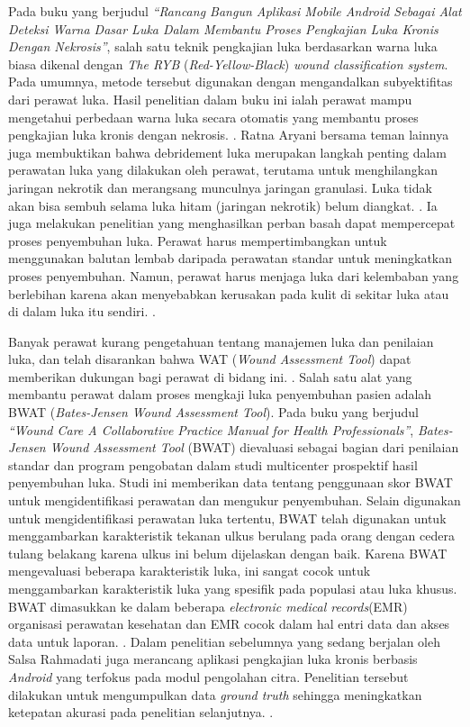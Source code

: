Pada buku yang berjudul \textit{“Rancang Bangun Aplikasi Mobile Android Sebagai Alat Deteksi Warna Dasar Luka Dalam Membantu Proses Pengkajian Luka Kronis Dengan Nekrosis”}, salah satu teknik pengkajian luka berdasarkan warna luka biasa dikenal dengan \textit{The RYB} (\textit{Red-Yellow-Black}) \textit{wound classification system}. Pada umumnya, metode tersebut digunakan dengan mengandalkan subyektifitas dari perawat luka. Hasil penelitian dalam buku ini ialah perawat mampu mengetahui perbedaan warna luka secara otomatis yang membantu proses pengkajian luka kronis dengan nekrosis. \citep{aryani2018}. Ratna Aryani bersama teman lainnya juga membuktikan bahwa debridement luka merupakan langkah penting dalam perawatan luka yang dilakukan oleh perawat, terutama untuk menghilangkan jaringan nekrotik dan merangsang munculnya jaringan granulasi. Luka tidak akan bisa sembuh selama luka hitam (jaringan nekrotik) belum diangkat. \citep{aryani2017autolytic}. Ia juga melakukan penelitian yang menghasilkan perban basah dapat mempercepat proses penyembuhan luka. Perawat harus mempertimbangkan untuk menggunakan balutan lembab daripada perawatan standar untuk meningkatkan proses penyembuhan. Namun, perawat harus menjaga luka dari kelembaban yang berlebihan karena akan menyebabkan kerusakan pada kulit di sekitar luka atau di dalam luka itu sendiri. \citep{aryani2016accelerating}.

Banyak perawat kurang pengetahuan tentang manajemen luka dan penilaian luka, dan telah disarankan bahwa WAT (\textit{Wound Assessment Tool}) dapat memberikan dukungan bagi perawat di bidang ini. \citep{Greatrex-White2015wound}. Salah satu alat yang membantu perawat dalam proses mengkaji luka penyembuhan pasien adalah BWAT (\textit{Bates-Jensen Wound Assessment Tool}). Pada buku yang berjudul \textit{“Wound Care A Collaborative Practice Manual for Health Professionals”}, \textit{Bates-Jensen Wound Assessment Tool} (BWAT) dievaluasi sebagai bagian dari penilaian standar dan program pengobatan dalam studi multicenter prospektif hasil penyembuhan luka. Studi ini memberikan data tentang penggunaan skor BWAT untuk mengidentifikasi perawatan dan mengukur penyembuhan. Selain digunakan untuk mengidentifikasi perawatan luka tertentu, BWAT telah digunakan untuk menggambarkan karakteristik tekanan ulkus berulang pada orang dengan cedera tulang belakang karena ulkus ini belum dijelaskan dengan baik. Karena BWAT mengevaluasi beberapa karakteristik luka, ini sangat cocok untuk menggambarkan karakteristik luka yang spesifik pada populasi atau luka khusus. BWAT dimasukkan ke dalam beberapa \textit{electronic medical records}(EMR) organisasi perawatan kesehatan dan EMR cocok dalam hal entri data dan akses data untuk laporan. \citep{sussman2012}. Dalam penelitian sebelumnya yang sedang berjalan oleh Salsa Rahmadati juga merancang aplikasi pengkajian luka kronis berbasis \textit{Android} yang terfokus pada modul pengolahan citra. Penelitian tersebut dilakukan untuk mengumpulkan data \textit{ground truth} sehingga meningkatkan ketepatan akurasi pada penelitian selanjutnya. \citep{rahmadati2023aplikasi}.

